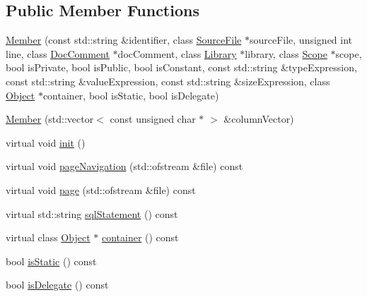 \subsection*{Public Member Functions}
\begin{CompactItemize}
\item 
\hyperlink{classvjassdoc_1_1Member_7d85b6523c38a202e0c5e05c2b28c51a}{Member} (const std::string \&identifier, class \hyperlink{classvjassdoc_1_1SourceFile}{SourceFile} $\ast$sourceFile, unsigned int line, class \hyperlink{classvjassdoc_1_1DocComment}{DocComment} $\ast$docComment, class \hyperlink{classvjassdoc_1_1Library}{Library} $\ast$library, class \hyperlink{classvjassdoc_1_1Scope}{Scope} $\ast$scope, bool isPrivate, bool isPublic, bool isConstant, const std::string \&typeExpression, const std::string \&valueExpression, const std::string \&sizeExpression, class \hyperlink{classvjassdoc_1_1Object}{Object} $\ast$container, bool isStatic, bool isDelegate)
\item 
\hyperlink{classvjassdoc_1_1Member_6a4d211407bef23d4a7cd4c70f5ca8f7}{Member} (std::vector$<$ const unsigned char $\ast$ $>$ \&columnVector)
\item 
virtual void \hyperlink{classvjassdoc_1_1Member_eccac74ca5ea37e82d322c20b5aa2efc}{init} ()
\item 
virtual void \hyperlink{classvjassdoc_1_1Member_fa8e020175714b1f03a3696cc935941f}{pageNavigation} (std::ofstream \&file) const 
\item 
virtual void \hyperlink{classvjassdoc_1_1Member_2bd66eba1882dfb2dcbf2552b42d1346}{page} (std::ofstream \&file) const 
\item 
virtual std::string \hyperlink{classvjassdoc_1_1Member_ad210521f998bd4c8be5f8af3ae74cf1}{sqlStatement} () const 
\item 
virtual class \hyperlink{classvjassdoc_1_1Object}{Object} $\ast$ \hyperlink{classvjassdoc_1_1Member_313ed6d74338700b34409ccad8dc5360}{container} () const 
\item 
bool \hyperlink{classvjassdoc_1_1Member_f832d9e8d585167eb8cb3e9051b03ba0}{isStatic} () const 
\item 
bool \hyperlink{classvjassdoc_1_1Member_d6df00fb8a3bfe32915e00c7ddb8fbbe}{isDelegate} () const 
\end{CompactItemize}


